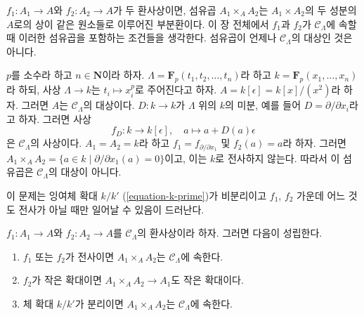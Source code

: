 \noindent
$f_1: A_1 \to A$와 $f_2: A_2 \to A$가 두 환사상이면, 섬유곱
$A_1 \times_A A_2$는 $A_1 \times A_2$의 두 성분의 $A$로의 상이 같은
원소들로 이루어진 부분환이다. 이 장 전체에서 $f_1$과 $f_2$가
$\mathcal{C}_\Lambda$에 속할 때 이러한 섬유곱을 포함하는 조건들을 생각한다.
섬유곱이 언제나 $\mathcal{C}_\Lambda$의 대상인 것은 아니다.

\begin{example}
\label{example-fibre-product}
$p$를 소수라 하고 $n \in \mathbf{N}$이라 하자.
$\Lambda = \mathbf{F}_p(t_1, t_2, \ldots, t_n)$라 하고
$k = \mathbf{F}_p(x_1, \ldots, x_n)$라 하되, 사상 $\Lambda \to k$는
$t_i \mapsto x_i^p$로 주어진다고 하자.
$A = k[\epsilon] = k[x]/(x^2)$라 하자.
그러면 $A$는 $\mathcal{C}_\Lambda$의 대상이다. $D : k \to k$가
$\Lambda$ 위의 $k$의 미분, 예를 들어
$D = \partial/\partial x_i$라고 하자. 그러면 사상
$$
f_D : k \longrightarrow k[\epsilon], \quad
a \mapsto a + D(a)\epsilon
$$
은 $\mathcal{C}_\Lambda$의 사상이다. $A_1 = A_2 = k$라 하고
$f_1 = f_{\partial/\partial x_1}$ 및 $f_2(a) = a$라 하자. 그러면
$A_1 \times_A A_2 = \{a \in k \mid \partial/\partial x_1(a) = 0\}$이고,
이는 $k$로 전사하지 않는다. 따라서 이 섬유곱은
$\mathcal{C}_\Lambda$의 대상이 아니다.
\end{example}

\noindent
이 문제는 잉여체 확대 $k/k'$ (\ref{equation-k-prime})가 비분리이고
$f_1$, $f_2$ 가운데 어느 것도 전사가 아닐 때만 일어날 수 있음이 드러난다.

\begin{lemma}
\label{lemma-fiber-product-CLambda}
$f_1 : A_1 \to A$와 $f_2 : A_2 \to A$를
$\mathcal{C}_\Lambda$의 환사상이라 하자. 그러면 다음이 성립한다.
\begin{enumerate}
\item $f_1$ 또는 $f_2$가 전사이면
$A_1 \times_A A_2$는 $\mathcal{C}_\Lambda$에 속한다.
\item $f_2$가 작은 확대이면
$A_1 \times_A A_2 \to A_1$도 작은 확대이다.
\item 체 확대 $k/k'$가 분리이면
$A_1 \times_A A_2$는 $\mathcal{C}_\Lambda$에 속한다.
\end{enumerate}
\end{lemma}

